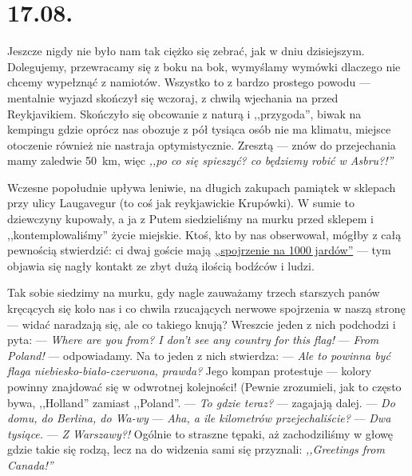 \chapter*{17.08.}

Jeszcze nigdy nie było nam tak ciężko się zebrać, jak w dniu dzisiejszym. Dolegujemy, przewracamy się z boku na bok, wymyślamy wymów\-ki dlaczego nie chcemy wypełznąć z namiotów. Wszystko to z bardzo prostego powodu --- mentalnie wyjazd skończył się wczoraj, z chwilą wjechania na  przed Reykjavikiem. Skończyło się obcowanie z naturą i ,,przygoda'', biwak na kempingu gdzie oprócz nas obozuje z pół tysiąca osób nie ma klimatu, miejsce otoczenie również nie nastraja optymistycznie. Zresztą --- znów do przejechania mamy zaledwie 50~km, więc \emph{,,po co się spieszyć? co będziemy robić w Asbru?!''}

Wczesne popołudnie upływa leniwie, na długich zakupach pamiątek w sklepach przy ulicy Laugavegur (to coś jak reykjawickie Krupówki). W sumie to dziewczyny kupowały, a ja z Putem siedzieliśmy na murku przed sklepem i ,,kontemplowaliśmy'' życie miejskie. Ktoś, kto by nas obserwował, mógłby z całą pewnością stwierdzić: ci dwaj goście mają \href{http://en.wikipedia.org/wiki/Thousand-yard_stare}{,,spojrzenie na 1000 jardów''} --- tym objawia się nagły kontakt ze zbyt dużą ilością bodźców i ludzi.


Tak sobie siedzimy na murku, gdy nagle zauważamy trzech starszych panów kręcących się koło nas i co chwila rzucających nerwowe spojrzenia w naszą stronę --- widać naradzają się, ale co takiego knują? Wreszcie jeden z nich podchodzi i pyta: \newline
--- \emph{Where are you from? I don’t see any country for this flag!} \newline
--- \emph{From Poland!} --- odpowiadamy. \newline
Na to jeden z nich stwierdza: \newline
--- \emph{Ale to powinna być flaga niebiesko-biało-czerwona, prawda?} \newline
Jego kompan protestuje --- kolory powinny znajdować się w odwrotnej kolejności! (Pewnie zrozumieli, jak to często bywa, ,,Holland'' zamiast ,,Poland''. \newline
--- \emph{To gdzie teraz?} --- zagajają dalej. \newline
--- \emph{Do domu, do Berlina, do Wa-wy\textellipsis} \newline
--- \emph{Aha, a ile kilometrów przejechaliście?} \newline
--- \emph{Dwa tysiące.} \newline
--- \emph{Z Warszawy?!} \newline
Ogólnie to straszne tępaki, aż zachodziliśmy w głowę gdzie takie się rodzą, lecz na do widzenia sami się przyznali: \emph{,,Greetings from Canada!''}

